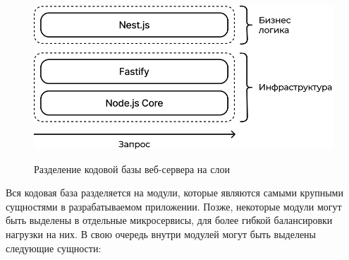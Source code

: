 \begin{figure}[H]
\begin{center}
\includegraphics[width=1.0\hsize]{fig/nestjs.png}\\[2mm]
\caption{Разделение кодовой базы веб-сервера на слои}\label{fig:nestjs}
\end{center}
\end{figure}

Вся кодовая база разделяется на модули, которые являются самыми крупными сущностями в разрабатываемом приложении. Позже, некоторые модули могут быть выделены в отдельные микросервисы, для более гибкой балансировки нагрузки на них. В свою очередь внутри модулей могут быть выделены следующие сущности:

